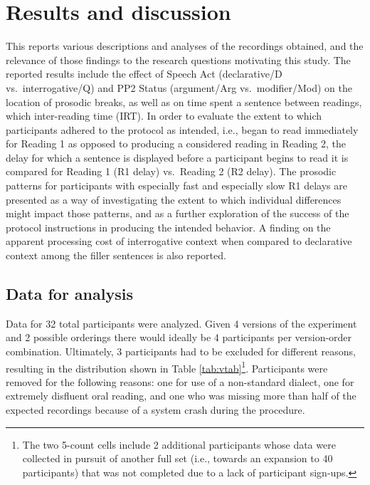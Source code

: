 \documentclass[12pt,oneside]{book}
\let\rmarkdownfootnote\footnote%
\def\footnote{\protect\rmarkdownfootnote}
\begin{document}
\hypertarget{res}{%
\chapter{Results and discussion}\label{res}}

This  reports various descriptions and analyses of the recordings obtained, and the relevance of those findings to the research questions motivating this study. The reported results include the effect of Speech Act (declarative/D vs.~interrogative/Q) and PP2 Status (argument/Arg vs.~modifier/Mod) on the location of prosodic breaks, as well as on time spent    a sentence between readings, which  inter-reading time (IRT). In order to evaluate the extent to which participants adhered to the protocol as intended, i.e., began to read immediately for Reading 1 as opposed to producing a considered reading in Reading 2, the delay for which a sentence is displayed before a participant begins to read it is compared for Reading 1 (R1 delay) vs.~Reading 2 (R2 delay). The prosodic patterns for participants with especially fast and especially slow R1 delays are presented as a way of investigating the extent to which individual differences might impact those patterns, and as a further exploration of the success of the protocol instructions in producing the intended behavior. A finding on the apparent processing cost of interrogative context when compared to declarative context among the filler sentences is also reported.

\hypertarget{data}{%
\section{Data for analysis}\label{data}}

Data for 32 total participants were analyzed. Given 4 versions of the experiment and 2 possible orderings there would ideally be 4 participants per version-order combination. Ultimately, 3 participants had to be excluded for different reasons, resulting in the distribution  shown in Table \ref{tab:vtab}\footnote{The two 5-count cells include 2 additional participants whose data were collected in pursuit of another full set (i.e., towards an expansion to 40 participants) that was not completed due to a lack of participant sign-ups.}. Participants were removed for the following reasons: one for use of a non-standard dialect, one for extremely disfluent oral reading, and one who was missing more than half of the expected recordings because of a system crash during the procedure.
\end{document}
